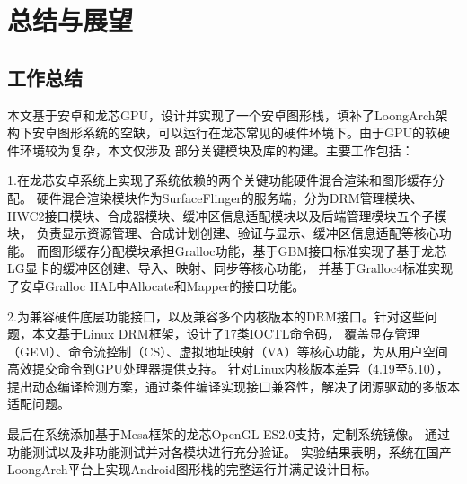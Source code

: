 
\chapter{总结与展望}

\section{工作总结}

本文基于安卓和龙芯GPU，设计并实现了一个安卓图形栈，填补了LoongArch架构下安卓图形系统的空缺，可以运行在龙芯常见的硬件环境下。由于GPU的软硬件环境较为复杂，本文仅涉及
部分关键模块及库的构建。主要工作包括：

1.在龙芯安卓系统上实现了系统依赖的两个关键功能硬件混合渲染和图形缓存分配。
硬件混合渲染模块作为SurfaceFlinger的服务端，分为DRM管理模块、HWC2接口模块、合成器模块、缓冲区信息适配模块以及后端管理模块五个子模块，
负责显示资源管理、合成计划创建、验证与显示、缓冲区信息适配等核心功能。
而图形缓存分配模块承担Gralloc功能，基于GBM接口标准实现了基于龙芯LG显卡的缓冲区创建、导入、映射、同步等核心功能，
并基于Gralloc4标准实现了安卓Gralloc HAL中Allocate和Mapper的接口功能。

2.为兼容硬件底层功能接口，以及兼容多个内核版本的DRM接口。针对这些问题，本文基于Linux DRM框架，设计了17类IOCTL命令码，
覆盖显存管理（GEM）、命令流控制（CS）、虚拟地址映射（VA）等核心功能，为从用户空间高效提交命令到GPU处理器提供支持。
针对Linux内核版本差异（4.19至5.10），提出动态编译检测方案，通过条件编译实现接口兼容性，解决了闭源驱动的多版本适配问题。



最后在系统添加基于Mesa框架的龙芯OpenGL ES2.0支持，定制系统镜像。
通过功能测试以及非功能测试并对各模块进行充分验证。
实验结果表明，系统在国产LoongArch平台上实现Android图形栈的完整运行并满足设计目标。

